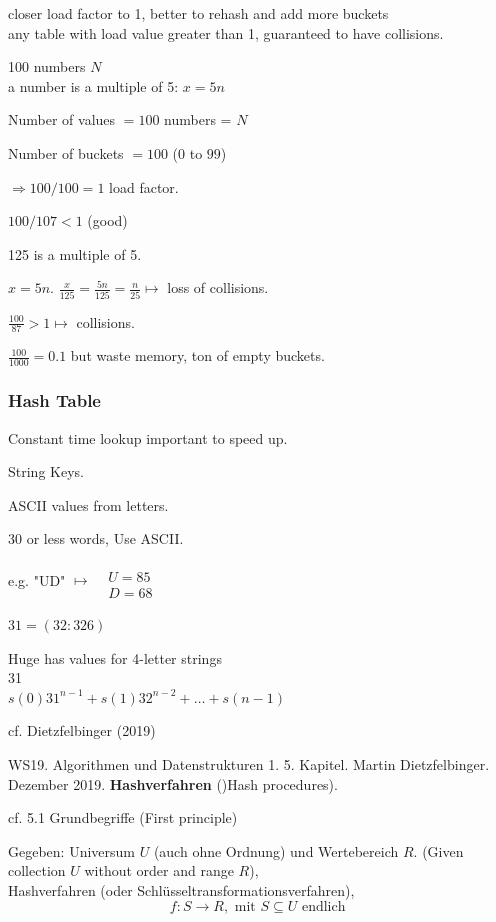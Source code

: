 \documentclass[10pt]{amsart}
\begin{document}
\begin{multicols*}{2}
closer load factor to 1, better to rehash and add more buckets \\
any table with load value greater than 1, guaranteed to have collisions.

100 numbers $N$ \\
a number is a multiple of 5: $x = 5n$ 

Number of values $= 100$ numbers = $N$

Number of buckets $= 100$ ($0$ to $99$)

$\Longrightarrow 100/ 100 = 1$ load factor.

$100/107 < 1$ (good)

125 is a multiple of 5.

$x=5n$. $\frac{x}{125} = \frac{5n}{125} = \frac{n}{25} \mapsto $ loss of collisions.

$\frac{100}{87} > 1 \mapsto$ collisions.

$\frac{100}{1000} = 0.1$ but waste memory, ton of empty buckets.

\subsubsection{Hash Table}

Constant time lookup important to speed up.

String Keys.

ASCII values from letters.

30 or less words, Use ASCII. 

e.g. "UD" $\mapsto \begin{aligned} & \quad \\
& U = 85 \\
& D = 68 \end{aligned}$ 

$31 = (32 : 326)$ 

Huge has values for 4-letter strings \\
31 \\
$s(0) 31^{n-1} + s(1) 32^{n-2} + \dots + s(n-1)$

cf. Dietzfelbinger (2019) \cite{Diet2019}

WS19. Algorithmen und Datenstrukturen 1. 5. Kapitel. Martin Dietzfelbinger. Dezember 2019. \textbf{Hashverfahren} ()Hash procedures).

cf. 5.1 Grundbegriffe (First principle) \cite{Diet2019}

Gegeben: Universum $U$ (auch ohne Ordnung) und Wertebereich $R$. (Given collection $U$ without order and range $R$), \\
Hashverfahren (oder Schl\"{u}sseltransformationsverfahren),
\begin{equation}
f:S \to R, \text{ mit } S \subseteq U \text{ endlich }
\end{equation}


\end{multicols*}
\end{document}
